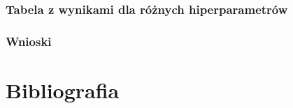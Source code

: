 \documentclass[a4paper, 12pt]{article}
\begin{document}
    \subsubsection{Tabela z wynikami dla różnych hiperparametrów}
    \subsubsection{Wnioski}
    \section{Bibliografia}
    \printbibliography
\end{document}
